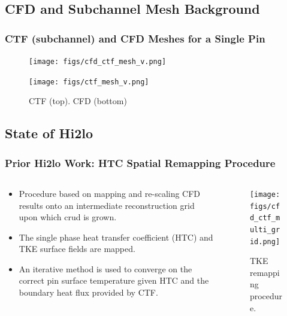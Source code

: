 \documentclass[t, pdftex]{beamer}
\begin{document}
\subsection*{CFD and Subchannel Mesh Background}
\begin{frame}
\frametitle{CTF (subchannel) and CFD Meshes for a Single Pin}
\vspace{-20pt}
\begin{figure}
	\centering
	\begin{minipage}{.4\textwidth}
		\centering
		\texttt{[image: figs/cfd\_ctf\_mesh\_v.png]}
		\caption{\centering \scriptsize CTF (top).  CFD (bottom) }
	\end{minipage}%
	\begin{minipage}{.4\textwidth}
		\centering
		\texttt{[image: figs/ctf\_mesh\_v.png]}
	\end{minipage}
\end{figure}
\cite{salko17}
\end{frame}


\subsection*{State of Hi2lo}
\begin{frame}[shrink=10]
\frametitle{Prior Hi2lo Work: HTC Spatial Remapping Procedure}
\begin{columns}
    \begin{column}{0.5\textwidth}
        \begin{itemize}
            \item Procedure based on mapping and re-scaling CFD results onto an intermediate reconstruction grid upon which crud is grown.
            \item The single phase heat transfer coefficient (HTC) and TKE surface fields are mapped.
            \item An iterative method is used to converge on the correct pin surface temperature given HTC and the boundary heat flux provided by CTF.
        \end{itemize}
    \end{column}
    \begin{column}{0.5\textwidth}  %
        \begin{center}
            \begin{figure}
                \texttt{[image: figs/cfd\_ctf\_multi\_grid.png]}
                \caption{\centering TKE remapping procedure. \cite{salko17}}      
            \end{figure}
        \end{center}
    \end{column}
\end{columns}
\vspace{-12pt}
\end{frame}
\end{document}
